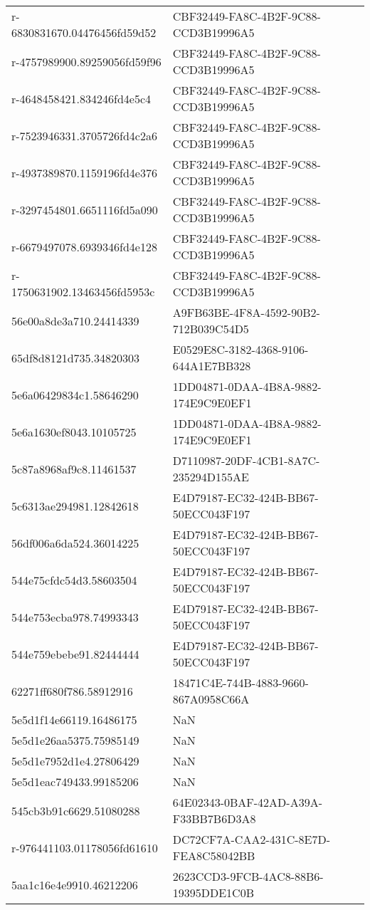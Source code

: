 \begin{tabular}{ll}
r-6830831670.04476456fd59d52 & CBF32449-FA8C-4B2F-9C88-CCD3B19996A5 \\
r-4757989900.89259056fd59f96 & CBF32449-FA8C-4B2F-9C88-CCD3B19996A5 \\
r-4648458421.834246fd4e5c4 & CBF32449-FA8C-4B2F-9C88-CCD3B19996A5 \\
r-7523946331.3705726fd4c2a6 & CBF32449-FA8C-4B2F-9C88-CCD3B19996A5 \\
r-4937389870.1159196fd4e376 & CBF32449-FA8C-4B2F-9C88-CCD3B19996A5 \\
r-3297454801.6651116fd5a090 & CBF32449-FA8C-4B2F-9C88-CCD3B19996A5 \\
r-6679497078.6939346fd4e128 & CBF32449-FA8C-4B2F-9C88-CCD3B19996A5 \\
r-1750631902.13463456fd5953c & CBF32449-FA8C-4B2F-9C88-CCD3B19996A5 \\
56e00a8de3a710.24414339 & A9FB63BE-4F8A-4592-90B2-712B039C54D5 \\
65df8d8121d735.34820303 & E0529E8C-3182-4368-9106-644A1E7BB328 \\
5e6a06429834c1.58646290 & 1DD04871-0DAA-4B8A-9882-174E9C9E0EF1 \\
5e6a1630ef8043.10105725 & 1DD04871-0DAA-4B8A-9882-174E9C9E0EF1 \\
5c87a8968af9c8.11461537 & D7110987-20DF-4CB1-8A7C-235294D155AE \\
5c6313ae294981.12842618 & E4D79187-EC32-424B-BB67-50ECC043F197 \\
56df006a6da524.36014225 & E4D79187-EC32-424B-BB67-50ECC043F197 \\
544e75cfdc54d3.58603504 & E4D79187-EC32-424B-BB67-50ECC043F197 \\
544e753ecba978.74993343 & E4D79187-EC32-424B-BB67-50ECC043F197 \\
544e759ebebe91.82444444 & E4D79187-EC32-424B-BB67-50ECC043F197 \\
62271ff680f786.58912916 & 18471C4E-744B-4883-9660-867A0958C66A \\
5e5d1f14e66119.16486175 & NaN \\
5e5d1e26aa5375.75985149 & NaN \\
5e5d1e7952d1e4.27806429 & NaN \\
5e5d1eac749433.99185206 & NaN \\
545cb3b91c6629.51080288 & 64E02343-0BAF-42AD-A39A-F33BB7B6D3A8 \\
r-976441103.01178056fd61610 & DC72CF7A-CAA2-431C-8E7D-FEA8C58042BB \\
5aa1c16e4e9910.46212206 & 2623CCD3-9FCB-4AC8-88B6-19395DDE1C0B \\

\end{tabular}
